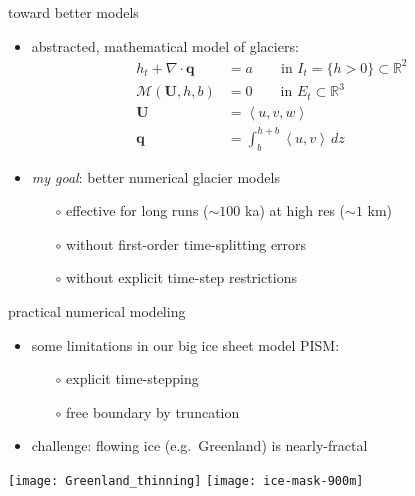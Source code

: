 \documentclass[xcolor={dvipsnames}]{beamer}
\newcommand\bq{\mathbf{q}}
\newcommand\bU{\mathbf{U}}
\newcommand\RR{\mathbb{R}}
\newcommand\Div{\nabla\cdot}
\begin{document}
\begin{frame}{toward better models}

\begin{itemize}
\item abstracted, mathematical model of glaciers:
\begin{align*}
h_t + \Div\bq &= a \qquad \text{in } I_t = \{h>0\} \subset \RR^2 \\
\mathcal{M}(\bU,h,b) &= 0 \qquad \text{in } E_t \subset \RR^3 \\
\bU &= \left<u,v,w\right> \\
\bq &= \int_b^{h+b} \left<u,v\right>\,dz
\end{align*}

\medskip
\item \emph{my goal}: better numerical glacier models
  \begin{itemize}
  \item[$\circ$] effective for long runs ($\sim 100$ ka) at high res ($\sim 1$ km) 
  \item[$\circ$] without first-order time-splitting errors 
  \item[$\circ$] without explicit time-step restrictions 
  \end{itemize}
\end{itemize}
\end{frame}


\begin{frame}{practical numerical modeling}

\begin{itemize}
\small
\item some limitations in our big ice sheet model PISM:
  \begin{itemize}
  \item[$\circ$] explicit time-stepping
  \item[$\circ$] free boundary by truncation
  \end{itemize}
\item challenge: flowing ice (e.g.~Greenland) is nearly-fractal
\end{itemize}

\begin{center}
\texttt{[image: Greenland\_thinning]} \quad \texttt{[image: ice-mask-900m]}
\end{center}
\end{frame}
\end{document}
